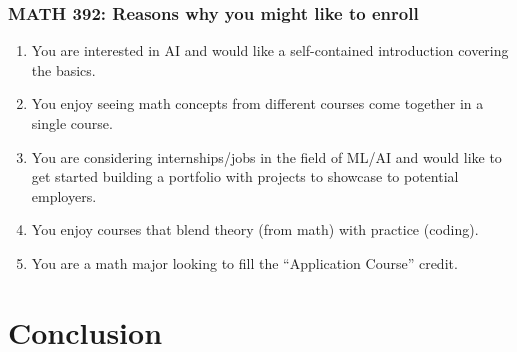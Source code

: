 \documentclass{beamer}
\theoremstyle{definition}
\begin{document}
\frame
{\frametitle{MATH 392: Reasons why you might like to enroll}


\begin{enumerate}[$\bullet$]
    \item You are interested in AI and would like a self-contained introduction covering the basics. \vspace{0.1in} \pause
    \item You enjoy seeing math concepts from different courses come together in a single course. \vspace{0.1in} \pause
    \item You are considering internships/jobs in the field of ML/AI and would like to get started building a portfolio with projects to showcase to potential employers. \vspace{0.1in} \pause
    \item You enjoy courses that blend theory (from math) with practice (coding). \vspace{0.1in} \pause
    \item You are a math major looking to fill the ``Application Course'' credit.
\end{enumerate}
}

\section{Conclusion}


\end{document}
